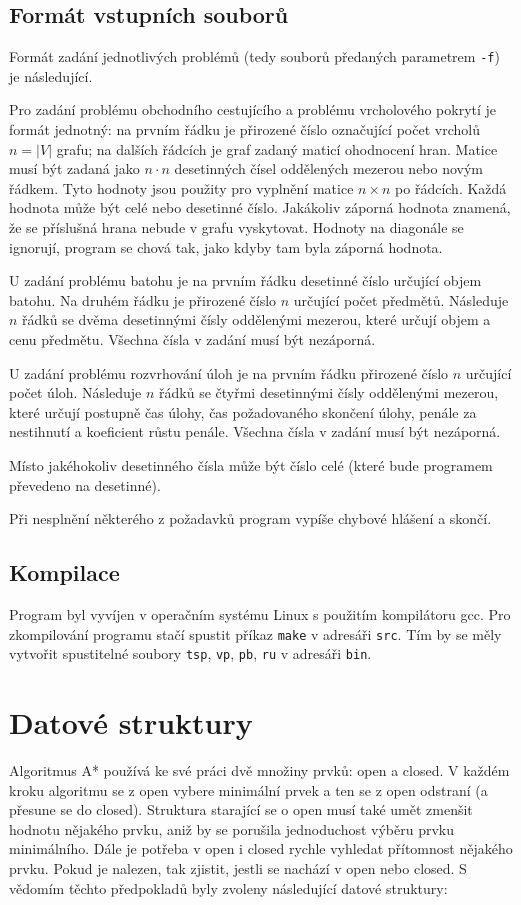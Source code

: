 \documentclass[12pt,notitlepage,fleqn]{report} %
\theoremstyle{definition}
\newcommand{\code}[1]{\texttt{#1}}
\begin{document}
  \subsection{Formát vstupních souborů}
  Formát zadání jednotlivých problémů (tedy souborů předaných parametrem \code{-f}) je následující.

  Pro zadání problému obchodního cestujícího a problému vrcholového pokrytí je formát jednotný: na prvním řádku je přirozené číslo označující počet vrcholů $n=|V|$ grafu; na dalších řádcích je graf zadaný maticí ohodnocení hran. Matice musí být zadaná jako $n \cdot n$ desetinných čísel oddělených mezerou nebo novým řádkem. Tyto hodnoty jsou použity pro vyplnění matice $n \times n$ po řádcích. Každá hodnota může být celé nebo desetinné číslo. Jakákoliv záporná hodnota znamená, že se příslušná hrana nebude v grafu vyskytovat. Hodnoty na diagonále se ignorují, program se chová tak, jako kdyby tam byla záporná hodnota.
  
  U zadání problému batohu je na prvním řádku desetinné číslo určující objem batohu. Na druhém řádku je přirozené číslo $n$ určující počet předmětů. Následuje $n$ řádků se dvěma desetinnými čísly oddělenými mezerou, které určují objem a cenu předmětu. Všechna čísla v zadání musí být nezáporná.
  
  U zadání problému rozvrhování úloh je na prvním řádku přirozené číslo $n$ určující počet úloh. Následuje $n$ řádků se čtyřmi desetinnými čísly oddělenými mezerou, které určují postupně čas úlohy, čas požadovaného skončení úlohy, penále za nestihnutí a koeficient růstu penále. Všechna čísla v zadání musí být nezáporná. 

  Místo jakéhokoliv desetinného čísla může být číslo celé (které bude programem převedeno na desetinné).
  
  Při nesplnění některého z požadavků program vypíše chybové hlášení a skončí. 
  
  \subsection{Kompilace}
  Program byl vyvíjen v operačním systému Linux s použitím kompilátoru gcc. Pro zkompilování programu stačí spustit příkaz \code{make} v adresáři \code{src}. Tím by se měly vytvořit spustitelné soubory \code{tsp}, \code{vp}, \code{pb}, \code{ru} v adresáři \code{bin}. 

  \section{Datové struktury}
  \label{sekce-datove-struktury}
  Algoritmus A* používá ke své práci dvě množiny prvků: open a closed. V každém kroku algoritmu se z open vybere minimální prvek a ten se z open odstraní (a přesune se do closed). Struktura starající se o open musí také umět zmenšit hodnotu nějakého prvku, aniž by se porušila jednoduchost výběru prvku minimálního. Dále je potřeba v open i closed rychle vyhledat přítomnost nějakého prvku. Pokud je nalezen, tak zjistit, jestli se nachází v open nebo closed. S vědomím těchto předpokladů byly zvoleny následující datové struktury:
  
\end{document}
